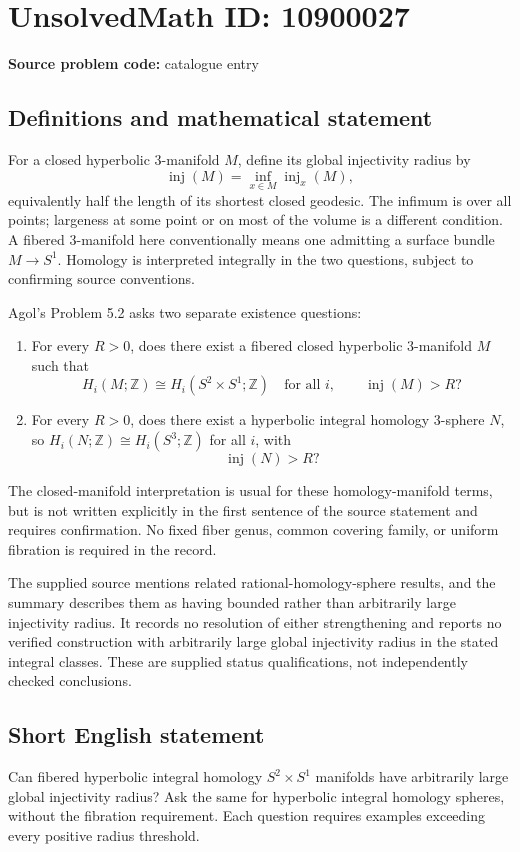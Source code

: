 \documentclass[11pt]{article}
\newcommand{\Z}{\mathbb{Z}}
\begin{document}
\section*{UnsolvedMath ID: 10900027}
\textbf{Source problem code:} catalogue entry
\subsection{Definitions and mathematical statement}
For a closed hyperbolic \(3\)-manifold \(M\), define its global injectivity radius by
\[
 \operatorname{inj}(M)=\inf_{x\in M}\operatorname{inj}_x(M),
\]
equivalently half the length of its shortest closed geodesic. The infimum is over all points; largeness at some point or on most of the volume is a different condition. A fibered \(3\)-manifold here conventionally means one admitting a surface bundle \(M\to S^1\). Homology is interpreted integrally in the two questions, subject to confirming source conventions.

Agol's Problem 5.2 asks two separate existence questions:
\begin{enumerate}
\item For every \(R>0\), does there exist a fibered closed hyperbolic \(3\)-manifold \(M\) such that
\[
 H_i(M;\Z)\cong H_i(S^2\times S^1;\Z)\quad\text{for all }i,
 \qquad\operatorname{inj}(M)>R?
\]
\item For every \(R>0\), does there exist a hyperbolic integral homology \(3\)-sphere \(N\), so \(H_i(N;\Z)\cong H_i(S^3;\Z)\) for all \(i\), with
\[
 \operatorname{inj}(N)>R?
\]
\end{enumerate}
The closed-manifold interpretation is usual for these homology-manifold terms, but is not written explicitly in the first sentence of the source statement and requires confirmation. No fixed fiber genus, common covering family, or uniform fibration is required in the record.

The supplied source mentions related rational-homology-sphere results, and the summary describes them as having bounded rather than arbitrarily large injectivity radius. It records no resolution of either strengthening and reports no verified construction with arbitrarily large global injectivity radius in the stated integral classes. These are supplied status qualifications, not independently checked conclusions.
\subsection{Short English statement}
Can fibered hyperbolic integral homology \(S^2\times S^1\) manifolds have arbitrarily large global injectivity radius? Ask the same for hyperbolic integral homology spheres, without the fibration requirement. Each question requires examples exceeding every positive radius threshold.
\end{document}
